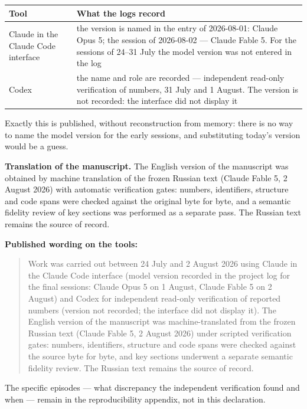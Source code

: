 \documentclass[11pt,a4paper]{article}
\renewcommand{\_}{\textunderscore\allowbreak}
\begin{document}
\begin{center}
\small
\begin{tabularx}{\textwidth}{lX}
\toprule
Tool & What the logs record \\
\midrule
Claude in the Claude Code interface & the version is named in the entry of 2026-08-01: Claude Opus 5; the session of 2026-08-02 — Claude Fable 5. For the sessions of 24–31 July the model version was not entered in the log \\
Codex & the name and role are recorded — independent read-only verification of numbers, 31 July and 1 August. The version is not recorded: the interface did not display it \\
\bottomrule
\end{tabularx}
\end{center}

Exactly this is published, without reconstruction from memory: there is no way to
name the model version for the early sessions, and substituting today's version
would be a guess.

\textbf{Translation of the manuscript.} The English version of the manuscript was
obtained by machine translation of the frozen Russian text (Claude Fable 5,
2 August 2026) with automatic verification gates: numbers, identifiers,
structure and code spans were checked against the original byte for byte, and
a semantic fidelity review of key sections was performed as a separate pass.
The Russian text remains the source of record.

\textbf{Published wording on the tools:}

\begin{quote}
Work was carried out between 24 July and 2 August 2026 using Claude in the Claude
Code interface (model version recorded in the project log for the final sessions:
Claude Opus 5 on 1 August, Claude Fable 5 on 2 August) and Codex for independent
read-only verification of reported numbers (version not recorded; the interface
did not display it). The English version of the manuscript was machine-translated
from the frozen Russian text (Claude Fable 5, 2 August 2026) under scripted
verification gates: numbers, identifiers, structure and code spans were checked
against the source byte for byte, and key sections underwent a separate semantic
fidelity review. The Russian text remains the source of record.
\end{quote}

The specific episodes — what discrepancy the independent verification found and
when — remain in the reproducibility appendix, not in this declaration.
\end{document}
